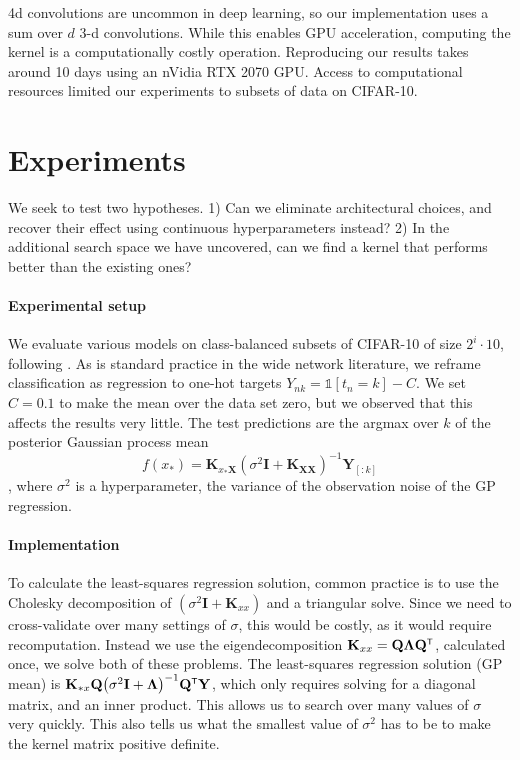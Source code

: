 \documentclass{article}
\theoremstyle{definition}
\newcommand{\vX}{\mathbf{X}}
\newcommand{\vQ}{\mathbf{Q}}
\newcommand{\vK}{\mathbf{K}}
\newcommand{\vY}{\mathbf{Y}}
\newcommand{\vLambda}{\boldsymbol{\Lambda}}
\newcommand{\eye}{\mathbf{I}}
\newcommand{\tp}{{\mathrm{\textsf{\tiny T}}}}
\newcommand{\bracket}[3]{{\left#1 #3 \right#2}}
\newcommand{\bra}{\bracket{(}{)}}
\newcommand{\indicator}[1]{{\mathds{1}}\left[#1\right]}
\begin{document}
4d convolutions are uncommon in deep learning, so our implementation uses a sum over $d$ 3-d convolutions. While this enables GPU acceleration, computing the kernel is a computationally costly operation. Reproducing our results takes around 10 days using an nVidia RTX 2070 GPU. Access to computational resources limited our experiments to subsets of data on CIFAR-10.

\section{Experiments}
We seek to test two hypotheses. 1) Can we eliminate architectural choices, and
recover their effect using continuous hyperparameters instead? 
2) In the additional search space we have uncovered, can we find a kernel that
performs better than the existing ones?

\paragraph{Experimental setup} We evaluate various models on class-balanced subsets of CIFAR-10 of size $2^i \cdot 10$, following \citep{arora2020small}. As is
standard practice in the wide network literature, we reframe classification as
regression to one-hot targets $Y_{nk} = \indicator{t_n = k} - C$. We set $C=0.1$ to make the mean over the data set zero, but we observed that this affects the results very little. The test
predictions are the argmax over $k$ of the posterior Gaussian process mean
\begin{equation}f(x_*) = \vK_{x_* \vX}\bra{\sigma^2\eye + \vK_{\vX\vX}}^{-1}\vY_{[:k]} \label{eq:mean-gp}\end{equation}, where
$\sigma^2$ is a hyperparameter, the variance of the observation noise of the GP regression. 

\paragraph{Implementation} To calculate the least-squares regression solution, common practice is to use the Cholesky decomposition of $\bra{\sigma^2\eye + \vK_{xx}}$ and a triangular solve. Since we need to cross-validate over many settings of $\sigma$, this would be costly, as it would require recomputation.
Instead we use the eigendecomposition $\vK_{xx} = \vQ\vLambda\vQ^\tp$, calculated once, we solve both of these problems. The least-squares regression solution (GP mean) is $\vK_{*x}\vQ\bra{\sigma^2\eye + \vLambda}^{-1}\vQ^\tp\vY$, which only requires solving for a diagonal matrix, and an inner product. This allows us to search over many values of $\sigma$ very quickly. This also tells us what the smallest value of $\sigma^2$ has to be to make the kernel matrix positive definite.
\end{document}

